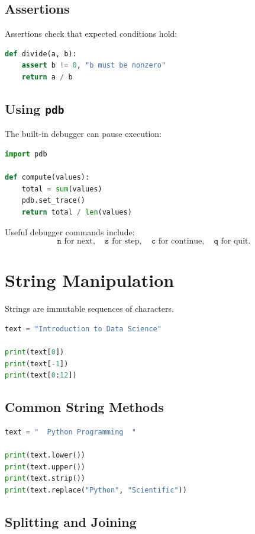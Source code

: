 \documentclass[12pt,oneside]{book}
\numberwithin{equation}{section}
\theoremstyle{definition}
\theoremstyle{plain}
\theoremstyle{remark}
\begin{document}
\subsection{Assertions}

Assertions check that expected conditions hold:
\begin{lstlisting}[language=Python]
def divide(a, b):
    assert b != 0, "b must be nonzero"
    return a / b
\end{lstlisting}

\subsection{Using \texttt{pdb}}

The built-in debugger can pause execution:
\begin{lstlisting}[language=Python]
import pdb

def compute(values):
    total = sum(values)
    pdb.set_trace()
    return total / len(values)
\end{lstlisting}

Useful debugger commands include:
\[
\texttt{n} \text{ for next}, \quad
\texttt{s} \text{ for step}, \quad
\texttt{c} \text{ for continue}, \quad
\texttt{q} \text{ for quit}.
\]

\section{String Manipulation}

Strings are immutable sequences of characters.

\begin{lstlisting}[language=Python]
text = "Introduction to Data Science"

print(text[0])
print(text[-1])
print(text[0:12])
\end{lstlisting}

\subsection{Common String Methods}

\begin{lstlisting}[language=Python]
text = "  Python Programming  "

print(text.lower())
print(text.upper())
print(text.strip())
print(text.replace("Python", "Scientific"))
\end{lstlisting}

\subsection{Splitting and Joining}
\end{document}
